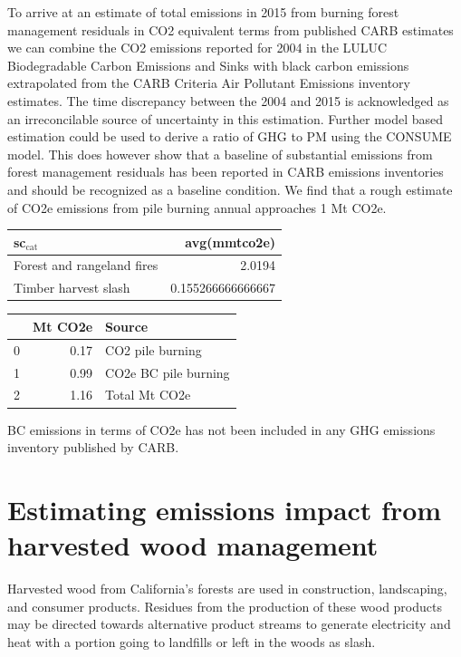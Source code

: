 \documentclass[a4paper]{article}
\begin{document}
To arrive at an estimate of total emissions in 2015 from burning forest
management residuals in CO2 equivalent terms from published CARB
estimates we can combine the CO2 emissions reported for 2004 in the
LULUC Biodegradable Carbon Emissions and Sinks with black carbon
emissions extrapolated from the CARB Criteria Air Pollutant Emissions
inventory estimates. The time discrepancy between the 2004 and 2015 is
acknowledged as an irreconcilable source of uncertainty in this
estimation. Further model based estimation could be used to derive a
ratio of GHG to PM using the CONSUME model. This does however show that a baseline of
substantial emissions from forest management residuals has been reported
in CARB emissions inventories and should be recognized as a baseline
condition. We find that a rough estimate of CO2e emissions from pile
burning annual approaches 1 Mt CO2e.

\begin{center}
\begin{tabular}{lr}
sc$_{\text{cat}}$ & avg(mmtco2e)\\
\hline
Forest and rangeland fires & 2.0194\\
Timber harvest slash & 0.155266666666667\\
\end{tabular}
\end{center}

\begin{center}
\begin{tabular}{rrl}
 & Mt CO2e & Source\\
\hline
0 & 0.17 & CO2 pile burning\\
1 & 0.99 & CO2e BC pile burning\\
2 & 1.16 & Total Mt CO2e\\
\end{tabular}
\end{center}

BC emissions in terms of CO2e has not been included in any GHG emissions
inventory published by CARB.


\section{Estimating emissions impact from harvested wood management}
\label{sec-3}
Harvested wood from California's forests are used in construction,
landscaping, and consumer products. Residues from the
production of these wood products may be directed towards alternative product streams to generate electricity and
heat with a portion going to landfills or left in the
woods as slash.
\end{document}

